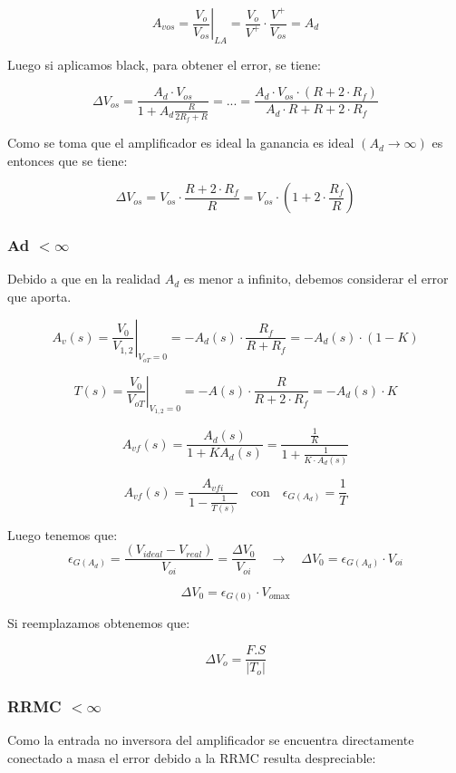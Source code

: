 \[
A_{vos} = \left.\frac{V_{o}}{V_{o s}}\right|_{LA} = 
\frac{V_{o}}{V^{+}} \cdot \frac{V^{+}}{V_{os}} = A_d
\]

Luego si aplicamos black, para obtener el error, se tiene:
 
\[
\Delta V_{os} = \frac{A_d \cdot V_{os}}{1+A_d \frac{R}{2 R_f+R}} = ... 
 = \frac{A_d \cdot V_{os} \cdot (R + 2 \cdot R_f)}{A_d \cdot R + R + 2 \cdot R_f}
\]
 

Como se toma que el amplificador es ideal la ganancia es ideal $\left(A_{d} \rightarrow \infty\right)$ es entonces que se tiene:

\[
\Delta V_{os}  = V_{os} \cdot \frac {R + 2 \cdot R_f}{R} 
=  V_{os} \cdot (1 + 2 \cdot \frac {R_f}{R} )
\]
 
\subsubsection{Ad \texorpdfstring{$< \infty$}{< ∞}}

Debido a que en la realidad $A_d$ es menor a infinito, debemos considerar el error que aporta.

\[ A_v(s) = \left.\frac{V_0}{V_{1,2}}\right|_{V_{oT} = 0}  = -A_d(s) \cdot \frac{R_f}{R + R_f} = -A_d(s) \cdot (1 - K) \]

\[ T(s) = \left.\frac{V_0}{V_{oT}}\right|_{V_{1,2} = 0} = -A(s) \cdot  \frac{R}{R + 2\cdot R_f}= - A_d(s) \cdot K \]

\[ A_{vf}(s) = \frac{A_d(s)}{1 + K A_d(s)} = \frac{ \frac{1}{K} }{1+\frac{1}{K\cdot A_d(s)}}  \]

\[A_{vf}(s) = \frac{A_{vfi}}{1 - \frac{1}{T(s)}}  \quad  \text{con}  \quad  \epsilon_{G(A_d)} = \frac{1}{T} \]


Luego tenemos que:
\[
\epsilon_{G(A_d)} = \frac{(V_{ideal} - V_{real})}{V_{oi}} = \frac{\Delta V_0}{V_{oi}} \quad \rightarrow \quad \Delta V_0 = \epsilon_{G(A_d)} \cdot V_{oi}  
\]



\[
\Delta V_0 = \epsilon_{G(0)} \cdot V_{o\text{max}} 
\]

Si reemplazamos obtenemos que:

$$
\Delta V_{o}=\frac{F.S}{\left|T_{o}\right|}
$$


\subsubsection{RRMC \texorpdfstring{$< \infty$}{< ∞}}

Como la entrada no inversora del amplificador se encuentra directamente conectado a masa el error debido a la RRMC resulta despreciable:

